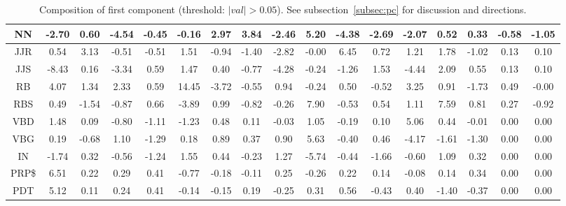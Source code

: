 \documentclass[%
 aip,
 jmp,%
 amsmath,amssymb,
 reprint,%
 floatfix,
]{revtex4-1}
\begin{document}
\begin{table}
\begin{tabular}{|c|| c|c|c|c|| c|c|c|c|| c|c|c|c|| c|c|c|c|}
NN & -2.70 & 0.60 & -4.54 & -0.45 & -0.16 & 2.97 & 3.84 & -2.46 & 5.20 & -4.38 & -2.69 & -2.07 & 0.52 & 0.33 & -0.58 & -1.05 \\\hline
JJR & 0.54 & 3.13 & -0.51 & -0.51 & 1.51 & -0.94 & -1.40 & -2.82 & -0.00 & 6.45 & 0.72 & 1.21 & 1.78 & -1.02 & 0.13 & 0.10 \\\hline
JJS & -8.43 & 0.16 & -3.34 & 0.59 & 1.47 & 0.40 & -0.77 & -4.28 & -0.24 & -1.26 & 1.53 & -4.44 & 2.09 & 0.55 & 0.13 & 0.10 \\\hline
RB & 4.07 & 1.34 & 2.33 & 0.59 & 14.45 & -3.72 & -0.55 & 0.94 & -0.24 & 0.50 & -0.52 & 3.25 & 0.91 & -1.73 & 0.49 & -0.00 \\\hline
RBS & 0.49 & -1.54 & -0.87 & 0.66 & -3.89 & 0.99 & -0.82 & -0.26 & 7.90 & -0.53 & 0.54 & 1.11 & 7.59 & 0.81 & 0.27 & -0.92 \\\hline
VBD & 1.48 & 0.09 & -0.80 & -1.11 & -1.23 & 0.48 & 0.11 & -0.03 & 1.05 & -0.19 & 0.10 & 5.06 & 0.44 & -0.01 & 0.00 & 0.00 \\\hline
VBG & 0.19 & -0.68 & 1.10 & -1.29 & 0.18 & 0.89 & 0.37 & 0.90 & 5.63 & -0.40 & 0.46 & -4.17 & -1.61 & -1.30 & 0.00 & 0.00 \\\hline
IN & -1.74 & 0.32 & -0.56 & -1.24 & 1.55 & 0.44 & -0.23 & 1.27 & -5.74 & -0.44 & -1.66 & -0.60 & 1.09 & 0.32 & 0.00 & 0.00 \\\hline
PRP\$ & 6.51 & 0.22 & 0.29 & 0.41 & -0.77 & -0.18 & -0.11 & 0.25 & -0.26 & 0.22 & 0.14 & -0.08 & 0.14 & 0.34 & 0.00 & 0.00 \\\hline
PDT & 5.12 & 0.11 & 0.24 & 0.41 & -0.14 & -0.15 & 0.19 & -0.25 & 0.31 & 0.56 & -0.43 & 0.40 & -1.40 & -0.37 & 0.00 & 0.00 \\\hline
\end{tabular}
  \caption{Composition of first component (threshold: $|val|>0.05$). See subsection~\ref{subsec:pc} for discussion and directions.}\label{tab:pca1}
\end{table}
\end{document}
